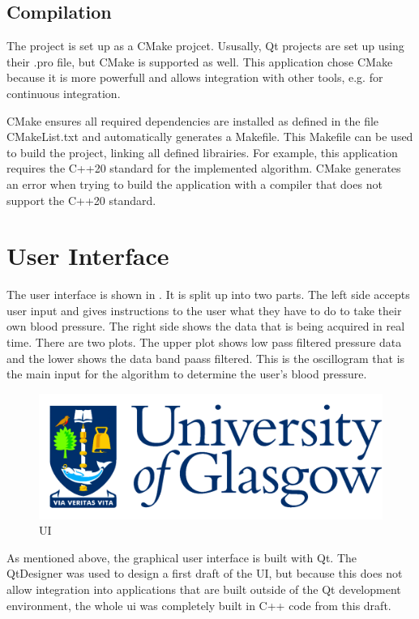 \subsection{Compilation}
The project is set up as a CMake projcet. Ususally, Qt projects are set up using their .pro file, but CMake is supported as well. This application chose CMake because it is more powerfull and allows integration with other tools, e.g. for continuous integration. %

CMake ensures all required dependencies are installed as defined in the file CMakeList.txt and automatically generates a Makefile. This Makefile can be used to build the project, linking all defined librairies. 
For example, this application requires the C++20 standard for the implemented algorithm. CMake generates an error when trying to build the application with a compiler that does not support the C++20 standard.

\section{User Interface}
The user interface is shown in . It is split up into two parts. The left side accepts user input and gives instructions to the user what they have to do to take their own blood pressure. The right side shows the data that is being acquired in real time. There are two plots. The upper plot shows low pass filtered pressure data and the lower shows the data band paass filtered. This is the oscillogram that is the main input for the algorithm to determine the user's blood pressure. 



\begin{figure}
\centering
\includegraphics[scale=0.125]{GlaLogo.pdf}
\caption{UI}
\label{fig:UI}
\end{figure}

As mentioned above, the graphical user interface is built with Qt. 
The QtDesigner was used to design a first draft of the UI, but because this does not allow integration into applications that are built outside of the Qt development environment, the whole ui was completely built in C++ code from this draft. 


